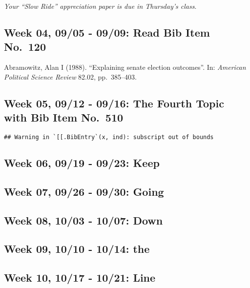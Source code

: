 \documentclass[
      12pt,
        ]{article}
\begin{document}
\emph{Your ``Slow Ride'' appreciation paper is due in Thursday's class}.

\hypertarget{week-04-0905---0909-read-bib-item-no.120}{%
\subsection{Week 04, 09/05 - 09/09: Read Bib Item
No.~120}\label{week-04-0905---0909-read-bib-item-no.120}}

Abramowitz, Alan I (1988). ``Explaining senate election outcomes''. In:
\emph{American Political Science Review} 82.02, pp.~385--403.

\hypertarget{week-05-0912---0916-the-fourth-topic-with-bib-item-no.510}{%
\subsection{Week 05, 09/12 - 09/16: The Fourth Topic with Bib Item
No.~510}\label{week-05-0912---0916-the-fourth-topic-with-bib-item-no.510}}

\begin{verbatim}
## Warning in `[[.BibEntry`(x, ind): subscript out of bounds
\end{verbatim}

\hypertarget{week-06-0919---0923-keep}{%
\subsection{Week 06, 09/19 - 09/23:
Keep}\label{week-06-0919---0923-keep}}

\hypertarget{week-07-0926---0930-going}{%
\subsection{Week 07, 09/26 - 09/30:
Going}\label{week-07-0926---0930-going}}

\hypertarget{week-08-1003---1007-down}{%
\subsection{Week 08, 10/03 - 10/07:
Down}\label{week-08-1003---1007-down}}

\hypertarget{week-09-1010---1014-the}{%
\subsection{Week 09, 10/10 - 10/14: the}\label{week-09-1010---1014-the}}

\hypertarget{week-10-1017---1021-line}{%
\subsection{Week 10, 10/17 - 10/21:
Line}\label{week-10-1017---1021-line}}
\end{document}
